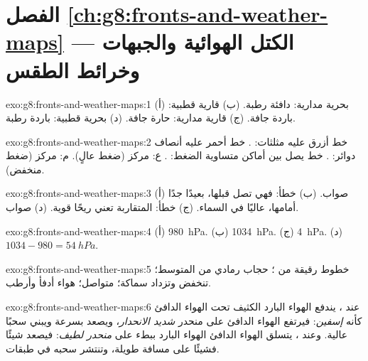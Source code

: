 \section*{الفصل \ref{ch:g8:fronts-and-weather-maps} --- الكتل الهوائية والجبهات وخرائط الطقس}

\begin{solution}{exo:g8:fronts-and-weather-maps:1}
(أ) بحرية مدارية: دافئة رطبة. (ب) قارية قطبية: باردة
جافة. (ج) قارية مدارية: حارة جافة. (د) بحرية قطبية: باردة
رطبة.
\end{solution}

\begin{solution}{exo:g8:fronts-and-weather-maps:2}
خط أزرق عليه مثلثات: . خط أحمر عليه أنصاف دوائر: . خط يصل بين أماكن متساوية الضغط: . ع: مركز
 (ضغط عالٍ). م: مركز 
(ضغط منخفض).
\end{solution}

\begin{solution}{exo:g8:fronts-and-weather-maps:3}
(أ) صواب. (ب) خطأ: فهي تصل قبلها، بعيدًا جدًا أمامها، عاليًا في السماء.
(ج) خطأ:  المتقاربة تعني ريحًا قوية. (د) صواب.
\end{solution}

\begin{solution}{exo:g8:fronts-and-weather-maps:4}
(أ) \qty{980}{hPa}. (ب) \qty{1034}{hPa}. (ج) \qty{4}{hPa}. (د) $1034 -
980 = \qty{54}{hPa}$.
\end{solution}

\begin{solution}{exo:g8:fronts-and-weather-maps:5}
خطوط رقيقة من ؛ حجاب رمادي من  المتوسط؛  تنخفض
وتزداد سماكة؛  متواصل؛ هواء أدفأ وأرطب.
\end{solution}

\begin{solution}{exo:g8:fronts-and-weather-maps:6}
عند ، يندفع الهواء البارد الكثيف تحت الهواء الدافئ كأنه
\emph{إسفين}: فيرتفع الهواء الدافئ على منحدر \emph{شديد الانحدار}، ويصعد بسرعة
ويبني سحبًا عالية. وعند ، يتسلق الهواء الدافئ الهواء البارد
ببطء على \emph{منحدر لطيف}: فيصعد شيئًا فشيئًا على مسافة
طويلة، وتنتشر سحبه في طبقات.
\end{solution}

